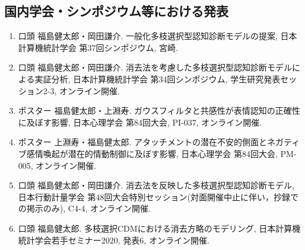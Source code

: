 \subsection*{国内学会・シンポジウム等における発表}
\begin{enumerate}
\item  口頭 福島健太郎・岡田謙介. {一般化多枝選択型認知診断モデルの提案}, 日本計算機統計学会 第37回シンポジウム, 宮崎.
\item  口頭 福島健太郎・岡田謙介. {消去法を考慮した多枝選択型認知診断モデルによる実証分析}, 日本計算機統計学会 第34回シンポジウム, 学生研究発表セッション2-3, オンライン開催.
\item  ポスター 福島健太郎・上淵寿. {ガウスフィルタと共感性が表情認知の正確性に及ぼす影響}, 日本心理学会 第84回大会, PI-037, オンライン開催.
\item  ポスター 上淵寿・福島健太郎. {アタッチメントの潜在不安的側面とネガティブ感情喚起が潜在的情動制御に及ぼす影響}, 日本心理学会 第84回大会, PM-005, オンライン開催.
\item  口頭 福島健太郎・岡田謙介. {消去法を反映した多枝選択型認知診断モデル}, 日本行動計量学会 第48回大会特別セッション(対面開催中止に伴い，抄録での掲示のみ), C4-4, オンライン開催.
\item  口頭 福島健太郎. {多枝選択CDMにおける消去方略のモデリング}, 日本計算機統計学会若手セミナー2020, 発表6, オンライン開催.
\end{enumerate}


